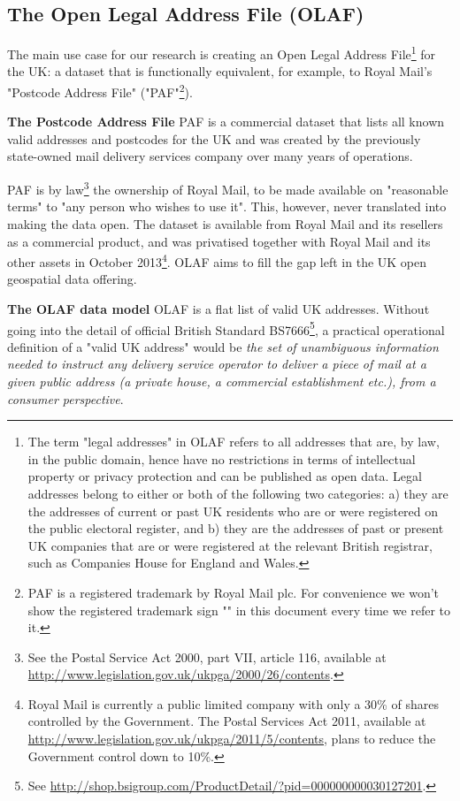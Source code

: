 \subsection{The Open Legal Address File (OLAF)}
\label{subs:the-problem-of-creating-an-olaf}

The main use case for our research is creating an Open Legal Address File\footnote{The term "legal addresses" in OLAF refers to all addresses that are, by law, in the public domain, hence have no restrictions in terms of intellectual property or privacy protection and can be published as open data. Legal addresses belong to either or both of the following two categories: a) they are the addresses of current or past UK residents who are or were registered on the public electoral register, and b) they are the addresses of past or present UK companies that are or were registered at the relevant British registrar, such as Companies House for England and Wales.} for the UK: a dataset that is functionally equivalent, for example, to Royal Mail's "Postcode Address File" ("PAF"\footnote{PAF is a registered trademark by Royal Mail plc. For convenience we won't show the registered trademark sign "\textregistered" in this document every time we refer to it.}). 

\textbf{The Postcode Address File} PAF is a commercial dataset that lists all known valid addresses and postcodes for the UK and was created by the previously state-owned mail delivery services company over many years of operations.

PAF is by law\footnote{See the Postal Service Act 2000, part VII, article 116, available at \url{http://www.legislation.gov.uk/ukpga/2000/26/contents}.} the ownership of Royal Mail, to be made available on "reasonable terms" to "any person who wishes to use it". This, however, never translated into making the data open. The dataset is available from Royal Mail and its resellers as a commercial product, and was privatised together with Royal Mail and its other assets in October 2013\footnote{Royal Mail is currently a public limited company with only a 30\% of shares controlled by the Government. The Postal Services Act 2011, available at \url{http://www.legislation.gov.uk/ukpga/2011/5/contents}, plans to reduce the Government control down to 10\%.}. OLAF aims to fill the gap left in the UK open geospatial data offering. 

\textbf{The OLAF data model} OLAF is a flat list of valid UK addresses. Without going into the detail of official British Standard BS7666\footnote{See \url{http://shop.bsigroup.com/ProductDetail/?pid=000000000030127201}.}, a practical operational definition of a "valid UK address" would be {\it the set of unambiguous information needed to instruct any delivery service operator to deliver a piece of mail at a given public address (a private house, a commercial establishment etc.), from a consumer perspective}. 

